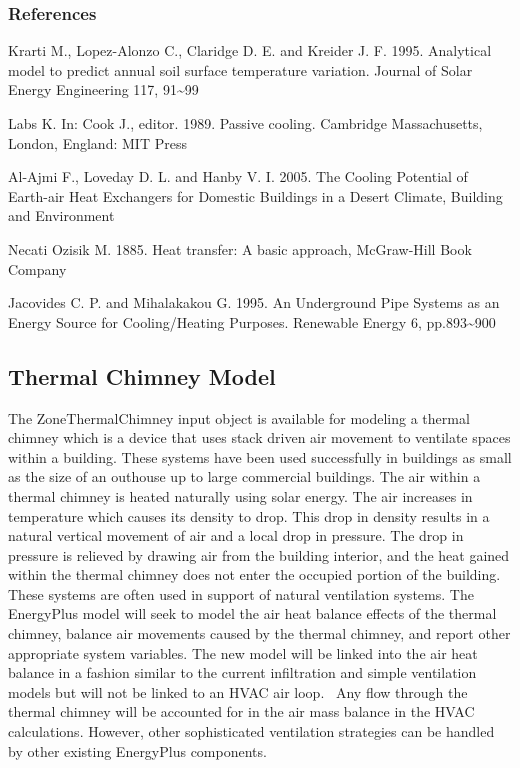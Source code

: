 \subsubsection{References}\label{references-6-001}

Krarti M., Lopez-Alonzo C., Claridge D. E. and Kreider J. F. 1995. Analytical model to predict annual soil surface temperature variation. Journal of Solar Energy Engineering 117, 91\textasciitilde{}99

Labs K. In: Cook J., editor. 1989. Passive cooling. Cambridge Massachusetts, London, England: MIT Press

Al-Ajmi F., Loveday D. L. and Hanby V. I. 2005. The Cooling Potential of Earth-air Heat Exchangers for Domestic Buildings in a Desert Climate, Building and Environment

Necati Ozisik M. 1885. Heat transfer: A basic approach, McGraw-Hill Book Company

Jacovides C. P. and Mihalakakou G. 1995. An Underground Pipe Systems as an Energy Source for Cooling/Heating Purposes. Renewable Energy 6, pp.893\textasciitilde{}900

\subsection{Thermal Chimney Model}\label{thermal-chimney-model}

The ZoneThermalChimney input object is available for modeling a thermal chimney which is a device that uses stack driven air movement to ventilate spaces within a building. These systems have been used successfully in buildings as small as the size of an outhouse up to large commercial buildings. The air within a thermal chimney is heated naturally using solar energy. The air increases in temperature which causes its density to drop. This drop in density results in a natural vertical movement of air and a local drop in pressure. The drop in pressure is relieved by drawing air from the building interior, and the heat gained within the thermal chimney does not enter the occupied portion of the building. These systems are often used in support of natural ventilation systems. The EnergyPlus model will seek to model the air heat balance effects of the thermal chimney, balance air movements caused by the thermal chimney, and report other appropriate system variables. The new model will be linked into the air heat balance in a fashion similar to the current infiltration and simple ventilation models but will not be linked to an HVAC air loop.~ Any flow through the thermal chimney will be accounted for in the air mass balance in the HVAC calculations. However, other sophisticated ventilation strategies can be handled by other existing EnergyPlus components.

